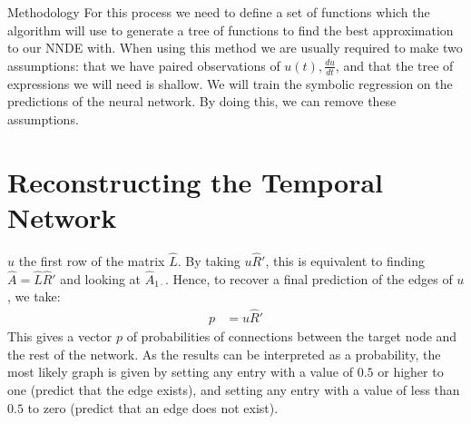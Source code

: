 \documentclass[12pt]{amsbook}
\begin{document}
\begin{chapter}{Methodology}
        For this process we need to define a set of functions which the algorithm will use to generate a tree of functions to find the best approximation to our NNDE with. When using this method we are usually required to make two assumptions: that we have paired observations of $u(t), \frac{du}{dt}$, and that the tree of expressions we will need is shallow. We will train the symbolic regression on the predictions of the neural network. By doing this, we can remove these assumptions\cite{kidger2022neural}.

    \section{Reconstructing the Temporal Network}
        $u$ the first row of the matrix $\hat L$. By taking $u\hat R'$, this is equivalent to finding $\hat A = \hat L \hat R'$ and looking at $\hat A_{1\cdot}$. Hence, to recover a final prediction of the edges of $u$, we take:
        \begin{align}
            p &= u \hat R'
        \end{align}
        This gives a vector $p$ of probabilities of connections between the target node and the rest of the network. As the results can be interpreted as a probability, the most likely graph is given by setting any entry with a value of $0.5$ or higher to one (predict that the edge exists), and setting any entry with a value of less than $0.5$ to zero (predict that an edge does not exist).
\end{chapter}
\end{document}
